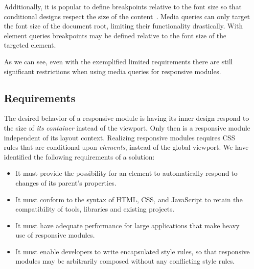 \documentclass{acm_proc_article-sp}
\begin{document}
    Additionally, it is popular to define breakpoints relative to the font size so that conditional designs respect the size of the content~\cite{mq-em}.
    Media queries can only target the font size of the document root, limiting their functionality drastically.
    With element queries breakpoints may be defined relative to the font size of the targeted element.

    As we can see, even with the exemplified limited requirements there are still significant restrictions when using media queries for responsive modules.
    
    \subsection{Requirements}\label{sec:reqs}

      The desired behavior of a responsive module is having its inner design respond to the size of \emph{its container} instead of the viewport.
      Only then is a responsive module independent of its layout context.
      Realizing responsive modules requires CSS rules that are conditional upon \emph{elements}, instead of the global viewport.
      We have identified the following requirements of a solution:

      \begin{itemize}
        \item 
          It must provide the possibility for an element to automatically respond to changes of its parent's properties.
        \item
          It must conform to the syntax of HTML, CSS, and JavaScript to retain the compatibility of tools, libraries and existing projects.
        \item
          It must have adequate performance for large applications that make heavy use of responsive modules.
        \item
          It must enable developers to write encapsulated style rules, so that responsive modules may be arbitrarily composed without any conflicting style rules.
      \end{itemize}
\end{document}

